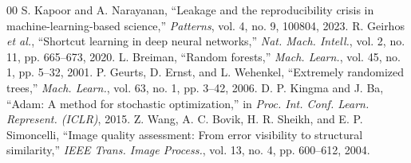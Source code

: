 \documentclass[conference]{IEEEtran}
\begin{document}
\begin{thebibliography}{00}
 S. Kapoor and A. Narayanan, ``Leakage and the reproducibility crisis in machine-learning-based science,'' \emph{Patterns}, vol. 4, no. 9, 100804, 2023.
 R. Geirhos \emph{et al.}, ``Shortcut learning in deep neural networks,'' \emph{Nat. Mach. Intell.}, vol. 2, no. 11, pp. 665--673, 2020.
 L. Breiman, ``Random forests,'' \emph{Mach. Learn.}, vol. 45, no. 1, pp. 5--32, 2001.
 P. Geurts, D. Ernst, and L. Wehenkel, ``Extremely randomized trees,'' \emph{Mach. Learn.}, vol. 63, no. 1, pp. 3--42, 2006.
 D. P. Kingma and J. Ba, ``Adam: A method for stochastic optimization,'' in \emph{Proc. Int. Conf. Learn. Represent. (ICLR)}, 2015.
 Z. Wang, A. C. Bovik, H. R. Sheikh, and E. P. Simoncelli, ``Image quality assessment: From error visibility to structural similarity,'' \emph{IEEE Trans. Image Process.}, vol. 13, no. 4, pp. 600--612, 2004.
\end{thebibliography}
\end{document}
